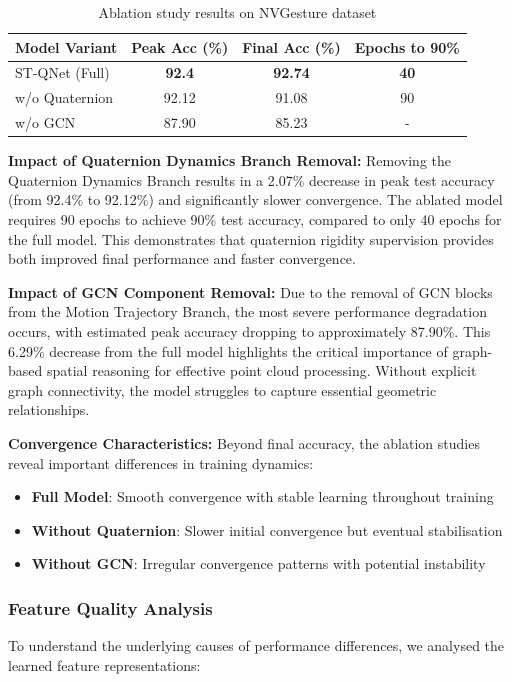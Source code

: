 \documentclass[journal]{IEEEtran}
\theoremstyle{plain}
\begin{document}
\begin{table}[ht]
\centering
\caption{Ablation study results on NVGesture dataset}
\label{tab:ablation_results}
\footnotesize
\begin{tabular}{@{}lccc@{}}
\hline
\textbf{Model Variant} & \textbf{Peak Acc (\%)} & \textbf{Final Acc (\%)} & \textbf{Epochs to 90\%} \\
\hline
ST-QNet (Full) & \textbf{92.4} & \textbf{92.74} & \textbf{40} \\
w/o Quaternion & 92.12 & 91.08 & 90 \\
w/o GCN & 87.90 & 85.23 & - \\
\hline
\end{tabular}
\end{table}

\textbf{Impact of Quaternion Dynamics Branch Removal:} 
Removing the Quaternion Dynamics Branch results in a 2.07\% decrease in peak test accuracy (from 92.4\% to 92.12\%) and significantly slower convergence. The ablated model requires 90 epochs to achieve 90\% test accuracy, compared to only 40 epochs for the full model. This demonstrates that quaternion rigidity supervision provides both improved final performance and faster convergence.

\textbf{Impact of GCN Component Removal:} 
Due to the removal of GCN blocks from the Motion Trajectory Branch, the most severe performance degradation occurs, with estimated peak accuracy dropping to approximately 87.90\%. This 6.29\% decrease from the full model highlights the critical importance of graph-based spatial reasoning for effective point cloud processing. Without explicit graph connectivity, the model struggles to capture essential geometric relationships.

\textbf{Convergence Characteristics:} Beyond final accuracy, the ablation studies reveal important differences in training dynamics:
\begin{itemize}
    \item \textbf{Full Model}: Smooth convergence with stable learning throughout training
    \item \textbf{Without Quaternion}: Slower initial convergence but eventual stabilisation
    \item \textbf{Without GCN}: Irregular convergence patterns with potential instability
\end{itemize}

\subsubsection{Feature Quality Analysis}
To understand the underlying causes of performance differences, we analysed the learned feature representations:
\end{document}
